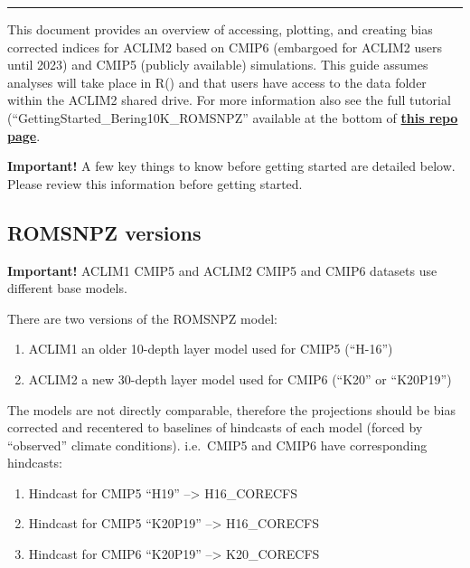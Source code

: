 \documentclass[
]{article}
\providecommand{\tightlist}{%
  \setlength{\itemsep}{0pt}\setlength{\parskip}{0pt}}
\begin{document}
\begin{center}\rule{0.5\linewidth}{0.5pt}\end{center}

This document provides an overview of accessing, plotting, and creating
bias corrected indices for ACLIM2 based on CMIP6 (embargoed for ACLIM2
users until 2023) and CMIP5 (publicly available) simulations. This guide
assumes analyses will take place in R() and that users have access to
the data folder within the ACLIM2 shared drive. For more information
also see the full tutorial (``GettingStarted\_Bering10K\_ROMSNPZ''
available at the bottom of
\href{https://github.com/kholsman/ACLIM2}{\textbf{this repo page}}.

\textbf{Important!} A few key things to know before getting started are
detailed below. Please review this information before getting started.

\hypertarget{romsnpz-versions}{%
\subsection{ROMSNPZ versions}\label{romsnpz-versions}}

\textbf{Important!} ACLIM1 CMIP5 and ACLIM2 CMIP5 and CMIP6 datasets use
different base models.

There are two versions of the ROMSNPZ model:

\begin{enumerate}
\def\labelenumi{\arabic{enumi}.}
\tightlist
\item
  ACLIM1 an older 10-depth layer model used for CMIP5 (``H-16'')
\item
  ACLIM2 a new 30-depth layer model used for CMIP6 (``K20'' or
  ``K20P19'')
\end{enumerate}

The models are not directly comparable, therefore the projections should
be bias corrected and recentered to baselines of hindcasts of each model
(forced by ``observed'' climate conditions). i.e.~CMIP5 and CMIP6 have
corresponding hindcasts:

\begin{enumerate}
\def\labelenumi{\arabic{enumi}.}
\tightlist
\item
  Hindcast for CMIP5 ``H19'' --\textgreater{} H16\_CORECFS
\item
  Hindcast for CMIP5 ``K20P19'' --\textgreater{} H16\_CORECFS
\item
  Hindcast for CMIP6 ``K20P19'' --\textgreater{} K20\_CORECFS
\end{enumerate}
\end{document}
